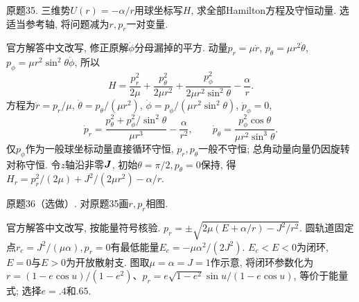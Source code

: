 \begin{exercise}
原题35. 三维势$U(r)=-\alpha/r$用球坐标写$H$, 求全部Hamilton方程及守恒动量. 选适当参考轴, 将问题减为$r,p_r$一对变量.
\end{exercise}
\begin{solution}
官方解答中文改写, 修正原解$\dot\phi$分母漏掉的平方. 动量$p_r=\mu\dot r$, $p_\theta=\mu r^2\dot\theta$, $p_\phi=\mu r^2\sin^2\theta\dot\phi$, 所以
\[
H=\frac{p_r^2}{2\mu}+\frac{p_\theta^2}{2\mu r^2}
+\frac{p_\phi^2}{2\mu r^2\sin^2\theta}-\frac\alpha r.
\]
方程为$\dot r=p_r/\mu$, $\dot\theta=p_\theta/(\mu r^2)$, $\dot\phi=p_\phi/(\mu r^2\sin^2\theta)$, $\dot p_\phi=0$,
\[
\dot p_r=\frac{p_\theta^2+p_\phi^2/\sin^2\theta}{\mu r^3}-\frac\alpha{r^2},
\qquad
\dot p_\theta=\frac{p_\phi^2\cos\theta}{\mu r^2\sin^3\theta}.
\]
仅$p_\phi$作为一般球坐标动量直接循环守恒, $p_r,p_\theta$一般不守恒; 总角动量向量仍因旋转对称守恒. 令$z$轴沿非零$\boldsymbol{J}$, 初始$\theta=\pi/2,p_\theta=0$保持, 得$H_r=p_r^2/(2\mu)+J^2/(2\mu r^2)-\alpha/r$.
\end{solution}

\begin{exercise}
原题36（选做）. 对原题35画$r,p_r$相图.
\end{exercise}
\begin{solution}
官方解答中文改写, 按能量符号核验. $p_r=\pm\sqrt{2\mu(E+\alpha/r)-J^2/r^2}$. 圆轨道固定点$r_c=J^2/(\mu\alpha),p_r=0$有最低能量$E_c=-\mu\alpha^2/(2J^2)$. $E_c<E<0$为闭环, $E=0$与$E>0$为开放散射支. 图取$\mu=\alpha=J=1$作示意, 将闭环参数化为$r=(1-e\cos u)/(1-e^2)$、$p_r=e\sqrt{1-e^2}\sin u/(1-e\cos u)$, 等价于能量式; 选择$e=.4$和$.65$.
\end{solution}
\begin{center}
\end{center}

